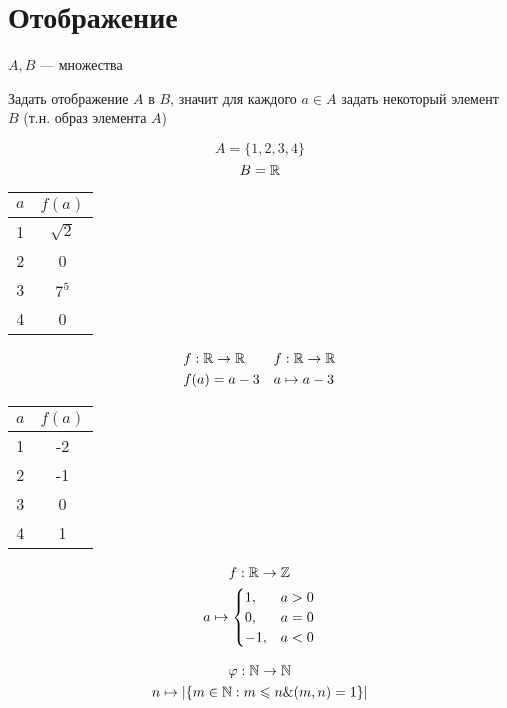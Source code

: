 \documentclass[main]{subfiles}
\begin{document}
\section{Отображение}
$A, B$ --- множества

\begin{definition}
    Задать отображение $A$ в $B$, значит для каждого $a \in A$ задать
    некоторый элемент $B$ (т.н. образ элемента $A$)
\end{definition}

\begin{center}
    \[A = \{1,2,3,4\}\]
    \[B = \mathbb{R}\]

    \begin{tabular}{c|c}
        $a$ & $f(a)$     \\
        \hline
        1   & $\sqrt{2}$ \\
        2   & 0          \\
        3   & $7^5$      \\
        4   & 0          \\
    \end{tabular}
\end{center}


\begin{center}
    \begin{align*}
         & f: \mathbb{R} \to \mathbb{R} &  & f: \mathbb{R} \to \mathbb{R}  \\
         & f(a)=a-3     &  & a \mapsto a-3
    \end{align*}

    \begin{tabular}{c|c}
        $a$ & $f(a)$ \\
        \hline
        1   & -2     \\
        2   & -1     \\
        3   & 0      \\
        4   & 1
    \end{tabular}
\end{center}


\begin{gather*}
    f: \mathbb{R} \to \mathbb{Z} \\
    a \mapsto \begin{cases}
        1,  & a > 0 \\
        0,  & a =0  \\
        -1, & a < 0
    \end{cases}
\end{gather*}

\begin{gather*}
    \varphi: \mathbb{N} \to \mathbb{N} \\
    n \mapsto |\{m \in \mathbb{N}: m \leqslant n \& (m,n) = 1\}|
\end{gather*}
\end{document}
